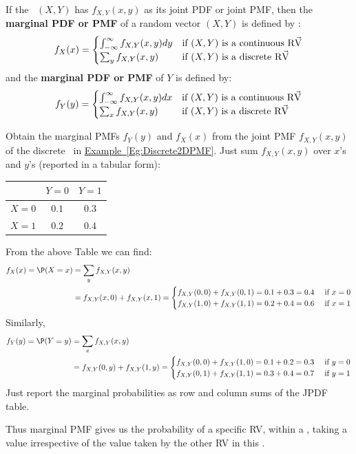 \begin{definition}
If the \rv~$(X,Y)$ has $f_{X,Y}(x,y)$ as its joint PDF or joint PMF, then the 
{\bf marginal PDF or PMF} of a random vector $(X,Y)$ is defined by :
\[
f_{X}(x) =
\begin{cases}
\int_{-\infty}^{\infty} f_{X,Y}(x,y) dy & \text{if $(X,Y)$ is a continuous {\mbox{R$\vec{\text V}$}}}  \\
\sum_{y} f_{X,Y}(x,y) & \text{if $(X,Y)$ is a discrete {\mbox{R$\vec{\text V}$}}} \\
\end{cases}
\]
and the  {\bf marginal PDF or PMF} of $Y$ is defined by:
\[
f_{Y}(y) = 
\begin{cases}
\int_{-\infty}^{\infty} f_{X,Y}(x,y) dx & \text{if $(X,Y)$ is a continuous {\mbox{R$\vec{\text V}$}}}  \\
\sum_{x} f_{X,Y}(x,y) & \text{if $(X,Y)$ is a discrete {\mbox{R$\vec{\text V}$}}} \\
\end{cases}
\]
\end{definition}

\begin{example}\label{EgGetMarginalFromJointDiscrete}
Obtain the marginal PMFs $f_Y(y)$ and $f_X(x)$ from the joint PMF $f_{X,Y}(x,y)$ of the discrete \rv~in \hyperref[Eg:Discrete2DPMF]{Example~\ref*{Eg:Discrete2DPMF}}.
Just sum $f_{X,Y}(x,y)$ over $x$'s and $y$'s (reported in a tabular form):
\begin{center}
\begin{tabular}{|c|c c|}
\hline
& $Y=0$ & $Y=1$ \\ \hline
$X=0$& $0.1$ & $0.3$  \\
$X=1$& $0.2$ & $0.4$  \\ \hline
\end{tabular}
\end{center}
From the above Table we can find:
\begin{align*}
f_X(x) = \P(X=x) 
&= \sum_{y} f_{X,Y}(x,y) \\
&= 
f_{X,Y}(x,0) + f_{X,Y}(x,1) = 
\begin{cases}
f_{X,Y}(0,0) + f_{X,Y}(0,1) = 0.1+0.3=0.4 & \text{ if } x=0\\
f_{X,Y}(1,0) + f_{X,Y}(1,1) = 0.2+0.4=0.6 & \text{ if } x=1\\
\end{cases}
\end{align*}
Similarly,
\begin{align*}
f_Y(y) = \P(Y=y) 
&= \sum_{x} f_{X,Y}(x,y) \\
&= 
f_{X,Y}(0,y) + f_{X,Y}(1,y) 
= 
\begin{cases}
f_{X,Y}(0,0) + f_{X,Y}(1,0) = 0.1+0.2=0.3 & \text{ if } y=0\\
f_{X,Y}(0,1) + f_{X,Y}(1,1) = 0.3+0.4=0.7 & \text{ if } y=1\\
\end{cases}
\end{align*}
Just report the marginal probabilities as row and column sums of the JPDF table.

Thus marginal PMF gives us the probability of a specific RV, within a \rv, taking a value irrespective of the value taken by the other RV in this \rv. 
\end{example}

